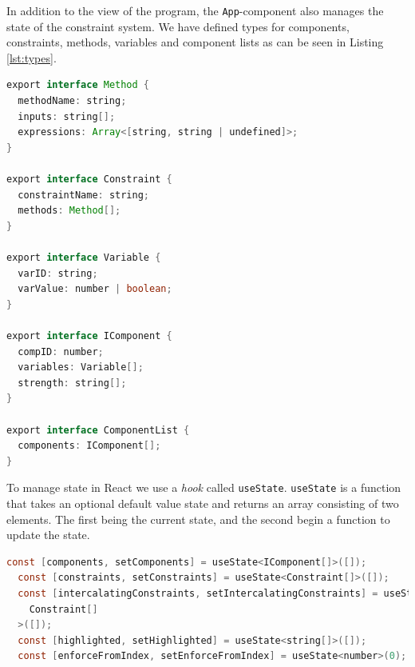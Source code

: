 \documentclass[11pt, a4paper]{article}
\begin{document}
In addition to the view of the program, the \texttt{App}-component also manages the state of the constraint system. We have defined types for components, constraints, methods, variables and component lists as can be seen in Listing \ref{lst:types}.

\begin{lstlisting}[float, language=java, caption={Types for constraint systems.}, label={lst:types}]
export interface Method {
  methodName: string;
  inputs: string[];
  expressions: Array<[string, string | undefined]>;
}

export interface Constraint {
  constraintName: string;
  methods: Method[];
}

export interface Variable {
  varID: string;
  varValue: number | boolean;
}

export interface IComponent {
  compID: number;
  variables: Variable[];
  strength: string[];
}

export interface ComponentList {
  components: IComponent[];
}
\end{lstlisting}

To manage state in React we use a \textit{hook} \cite{reacthooks} called \texttt{useState}. \texttt{useState} is a function that takes an optional default value state and returns an array consisting of two elements. The first being the current state, and the second begin a function to update the state.

\begin{lstlisting}[float, language=java, caption={Using \texttt{useState} to manage state.}, label={lst:usestate}]
  const [components, setComponents] = useState<IComponent[]>([]);
  const [constraints, setConstraints] = useState<Constraint[]>([]);
  const [intercalatingConstraints, setIntercalatingConstraints] = useState<
    Constraint[]
  >([]);
  const [highlighted, setHighlighted] = useState<string[]>([]);
  const [enforceFromIndex, setEnforceFromIndex] = useState<number>(0);
\end{lstlisting}

\clearpage


\end{document}
